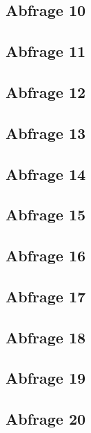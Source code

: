 \subsection{Abfrage 10}

\subsection{Abfrage 11}

\subsection{Abfrage 12}

\subsection{Abfrage 13}

\subsection{Abfrage 14}

\subsection{Abfrage 15}

\subsection{Abfrage 16}

\subsection{Abfrage 17}

\subsection{Abfrage 18}

\subsection{Abfrage 19}

\subsection{Abfrage 20}


